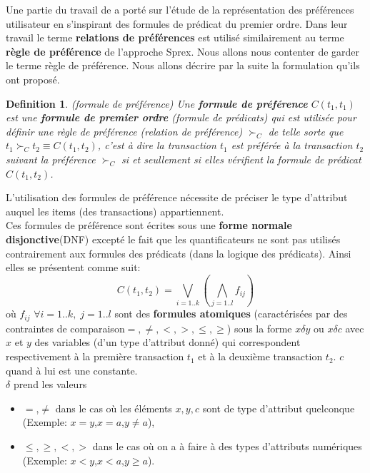 \documentclass[a4paper,12pt,openany,oneside]{article}
\newtheorem{defn}{Definition} %
\begin{document}
 	Une partie du travail de \cite{CHO} a porté sur l'étude de la représentation des préférences utilisateur en s'inspirant des formules de prédicat du premier ordre. Dans leur travail le terme \textbf{relations de préférences} est utilisé similairement au terme  \textbf{règle de préférence} de l'approche Sprex. Nous allons nous contenter de garder le terme règle de préférence. Nous allons décrire par la suite la formulation qu'ils ont proposé.\\

\begin{defn}(formule de préférence)
	Une  \textbf{formule de préférence} $C(t_{1},t_{1})$ est une \textbf{formule de premier ordre} (formule de prédicats) qui est utilisée pour définir une règle de préférence (relation de préférence) $\succ_{C}$ de telle sorte que $t_{1}\succ_{C} t_{2}\equiv C(t_{1},t_{2})$, c'est à dire la transaction $t_1$ est préférée à la transaction $t_2$ suivant la préférence $\succ_C$ si et seullement si elles vérifient la formule de prédicat $C(t_1,t_2)$.\\
\end{defn}
L'utilisation des formules de préférence nécessite de préciser le type d'attribut auquel les items (des transactions) appartiennent.\\
Ces formules de préférence sont écrites sous une \textbf{forme normale disjonctive}(DNF) excepté le fait que les quantificateurs ne sont pas utilisés contrairement aux formules des prédicats (dans la logique des prédicats). Ainsi elles se présentent comme suit:
 	 \[  
 	 	C(t_{1},t_{2})=\underset{i=1..k}{\bigvee}(\underset{j=1..l}{\bigwedge} f_{ij})
 	 \]
 	  où $f_{ij}$  $\forall i =1..k,\; j=1..l$ sont des \textbf{formules atomiques} (caractérisées par des contraintes de comparaison$= ,\neq,<,>,\leq,\geq$) sous la forme $x\delta y$ ou $x\delta c$ avec $x$ et $y$ des variables (d'un type d'attribut donné) qui correspondent respectivement à la première transaction $t_{1}$ et à la deuxième transaction $t_{2}$. $c$ quand à lui est une constante.\\
 	  $\delta$ prend les valeurs
\begin{itemize}
\item  $=$,$\neq$ dans le cas où les éléments $x,y,c$ sont de type d'attribut quelconque (Exemple: $x=y$,$x=a$,$y\neq a$),  
\item $\leqslant,\geqslant,<,>$ dans le cas où on a à faire à des types d'attributs numériques (Exemple: $x<y$,$x<a$,$y\geqslant a$).
\end{itemize}
\end{document}
